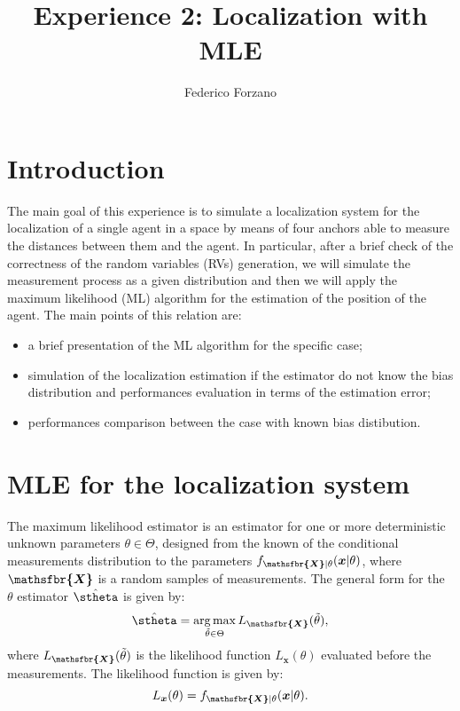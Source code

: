 \documentclass[%
    twoside, 
    a4paper
    ]{article}
\title{Experience 2: Localization with MLE}
\author{Federico Forzano}
\date{}
\DeclareMathOperator*{\argmax}{arg\,max}
\DeclareRobustCommand{\msf}[1]{%
  \ifcat\noexpand#1\relax\msfgreek{#1}\else\mathsfbr{#1}\fi%
}
\begin{document}
\maketitle

\section{Introduction}
    The main goal of this experience is to simulate a localization system for the localization of a single agent
    in a space by means of four anchors able to measure the distances between them and the agent.
    In particular, after a brief check of the correctness of the random variables (RVs) generation,
    we will simulate the measurement process as a given distribution and then we will apply the 
    maximum likelihood (ML) algorithm for the estimation of the position of the agent.
    The main points of this relation are:
    \begin{itemize}
        \item a brief presentation of the ML algorithm for the specific case;
        \item simulation of the localization estimation if the estimator do not know the bias distribution and 
        performances evaluation in terms of the estimation error;
        \item performances comparison between the case with known bias distibution.
    \end{itemize}

\section{MLE for the localization system}
    The maximum likelihood estimator is an estimator for one or more deterministic unknown parameters $\theta \in \Theta$,
    designed from the known of the conditional measurements distribution to the parameters
    $f_{\bm{\msf{X}}|\theta}(\bm{x}|\theta)$, where $\bm{\msf{X}}$ is a random samples of measurements.
    The general form for the $\theta$ estimator $\hat{\stheta}$ is given by:
    \begin{equation}
        \hat{\stheta} = \argmax_{\tilde{\theta} \in \Theta} L_{\bm{\msf{X}}}(\tilde{\theta}),
        \label{eq:MLE_general}
    \end{equation}
    where $L_{\bm{\msf{X}}}(\tilde{\theta})$ is the likelihood function $L_{\bm{x}}(\theta)$ 
    evaluated before the measurements. The likelihood function is given by: 
    \begin{equation}
        L_{\bm{x}}(\theta) = f_{\bm{\msf{X}}|\theta}(\bm{x}|\theta) .
        \label{eq:likelihood_function}
    \end{equation}
\end{document}
